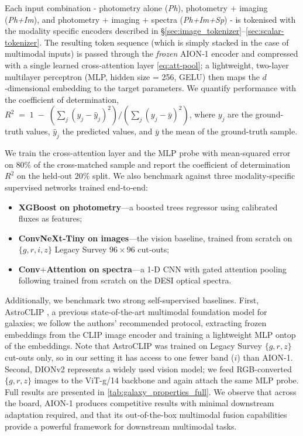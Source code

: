 \documentclass[]{polymathic}
\begin{document}
Each input combination - photometry alone (\textit{Ph}), photometry $+$ imaging (\textit{Ph+Im}), and photometry $+$ imaging $+$ spectra (\textit{Ph+Im+Sp}) - is tokenised with the modality specific encoders described in \S\ref{sec:image_tokenizer}–\ref{sec:scalar-tokenizer}. The resulting token sequence (which is simply stacked in the case of multimodal inputs) is passed through the \emph{frozen} AION‑1 encoder and compressed with a single learned cross‑attention layer \eqref{eq:att-pool}; a lightweight, two-layer multilayer perceptron (MLP, hidden size = 256, GELU) then maps the $d$‑dimensional embedding to the target parameters. We quantify performance with the coefficient of determination,
$R^{2} \;=\; 1 \;-\; (\sum_{j}(y_{j}-\hat{y}_{j})^{2})/ (\sum_{j}(y_{j}-\bar{y})^{2})$, where $y_{j}$ are the ground-truth values, $\hat{y}_{j}$ the predicted values, and $\bar{y}$ the mean of the ground-truth sample.

We train the cross-attention layer and the MLP probe with mean‑squared error on $80\%$ of the cross-matched sample and report the coefficient of determination $R^{2}$ on the held‑out $20\%$ split. We also benchmark against three modality‑specific supervised networks trained end‑to‑end:
\begin{itemize}
\setlength\itemsep{2pt}
\item \textbf{XGBoost on photometry}—a boosted trees regressor using calibrated fluxes as features;
\item \textbf{ConvNeXt‐Tiny on images}—the \cite{MMU} vision baseline,  trained from scratch on $\{g,r,i,z\}$ Legacy Survey $96\times96$ cut‑outs;
\item \textbf{Conv$+$Attention on spectra}—a 1‑D CNN with gated attention pooling following \citet{melchior2023autoencoding} trained from scratch on the DESI optical spectra.
\end{itemize}
Additionally, we benchmark two strong self-supervised baselines.
First, AstroCLIP \citep{Parker2024}, a previous state-of-the-art multimodal foundation model for galaxies; we follow the authors’ recommended protocol, extracting frozen embeddings from the CLIP image encoder and training a lightweight MLP ontop of the embeddings. Note that AstroCLIP was trained on Legacy Survey $\{g,r,z\}$ cut-outs only, so in our setting it has access to one fewer band ($i$) than AION-1. Second, DIONv2 \citep{oquab2023dinov2} represents a widely used vision model; we feed RGB-converted $\{g,r,z\}$ images to the ViT-g/14 backbone and again attach the same MLP probe. Full results are presented in \autoref{tab:galaxy_properties_full}. We observe that across the board, AION-1 produces competitive results with minimal downstream adaptation required, and that its out-of-the-box multimodal fusion capabilities provide a powerful framework for downstream multimodal tasks.
\end{document}
